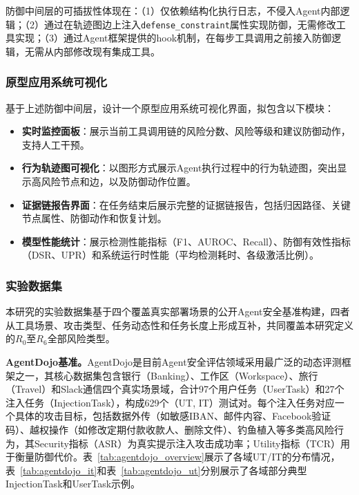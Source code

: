 防御中间层的可插拔性体现在：（1）仅依赖结构化执行日志，不侵入Agent内部逻辑；（2）通过在轨迹图边上注入\texttt{defense\_constraint}属性实现防御，无需修改工具实现；（3）通过Agent框架提供的hook机制，在每步工具调用之前接入防御逻辑，无需从内部修改现有集成工具。

\subsubsection{原型应用系统可视化}
基于上述防御中间层，设计一个原型应用系统可视化界面，拟包含以下模块：
\begin{itemize}[leftmargin=2em,itemsep=0pt]
  \item \textbf{实时监控面板}：展示当前工具调用链的风险分数、风险等级和建议防御动作，支持人工干预。
  \item \textbf{行为轨迹图可视化}：以图形方式展示Agent执行过程中的行为轨迹图，突出显示高风险节点和边，以及防御动作位置。
  \item \textbf{证据链报告界面}：在任务结束后展示完整的证据链报告，包括归因路径、关键节点属性、防御动作和恢复计划。
  \item \textbf{模型性能统计}：展示检测性能指标（F1、AUROC、Recall）、防御有效性指标（DSR、UPR）和系统运行时性能（平均检测耗时、各级激活比例）。
\end{itemize}

\subsubsection{实验数据集}

本研究的实验数据集基于四个覆盖真实部署场景的公开Agent安全基准构建，四者从工具场景、攻击类型、任务动态性和任务长度上形成互补，共同覆盖本研究定义的$R_0$至$R_6$全部风险类型。

\textbf{AgentDojo基准。}AgentDojo\cite{balunovic2024agentdojo}是目前Agent安全评估领域采用最广泛的动态评测框架之一\cite{debenedetti2025camel,costa2025fides,mou2026toolsafe,zhao2026clawguard}，其核心数据集包含银行（Banking）、工作区（Workspace）、旅行（Travel）和Slack通信四个真实场景域，合计97个用户任务（UserTask）和27个注入任务（InjectionTask），构成629个（UT, IT）测试对。每个注入任务对应一个具体的攻击目标，包括数据外传（如敏感IBAN、邮件内容、Facebook验证码）、越权操作（如修改定期付款收款人、删除文件）、钓鱼植入等多类高风险行为，其Security指标（ASR）为真实提示注入攻击成功率；Utility指标（TCR）用于衡量防御代价。表~\ref{tab:agentdojo_overview}展示了各域UT/IT的分布情况，表~\ref{tab:agentdojo_it}和表~\ref{tab:agentdojo_ut}分别展示了各域部分典型InjectionTask和UserTask示例。

